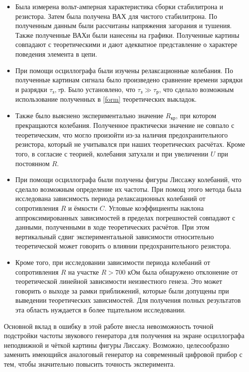\documentclass[a4paper,12pt]{article} %
\begin{document}
\begin{itemize}
	\item Была измерена вольт-амперная характеристика сборки стабилитрона и резистора. Затем была получена ВАХ для чистого стабилитрона. По полученным данным были рассчитаны напряжения загорания и тушения. Также полученные ВАХи были нанесены на графики. Полученные картины совпадают с теоретическими и дают адекватное представление о характере поведения элемента в цепи.
	\item При помощи осциллографа были изучены релаксационные колебания. По полученные картинам сигнала было произведено сравнение времени зарядки и разрядки $ \tau_\text{з}, \tau\text{р} $. Было установлено, что $ \tau_\text{з} \gg \tau_\text{р} $, что сделало возможным использование полученных в \ref{form} теоретических выкладок.
	\item Также было выяснено экспериментально значение $ R_\text{кр} $, при котором прекращаются колебания. Полученное практически значение не совпало с теоретическим, что могло произойти из-за наличия предохранительного резистора, который не учитывался при наших теоретических расчётах. Кроме того, в согласие с теорией, колебания затухали и при увеличении $ U $ при постоянном $ R $.
	\item При помощи осциллографа были получены фигуры Лиссажу колебаний, что сделало возможным определение их частоты. При помощ этого метода была исследована зависимость периода релаксационных колебаний от сопротивления $ R $ и ёмкости $ C $. Угловые коэффициенты наклона аппроксимированных зависимостей в пределах погрешностей совпадают с данными, полученными в ходе теоретических расчётов. При этом вертикальный сдвиг экспериментальной зависимости относительно теоретической может говорить о влиянии предохранительного резистора.
	\item Кроме того, при исследовании зависимости периода колебаний от сопротивления $ R $ на участке $ R > 700 $ кОм была обнаружено отклонение от теоретической линейной зависимости неизвестного генеза. Это может говорить о выходе за рамки приближений, которые были допущены при выведении теоретических зависимостей. Для получения полных результатов эта область нуждается в более тщательном исследовании.
\end{itemize}

Основной вклад в ошибку в этой работе внесла невозможность точной подстройки частоты звукового генератора для получения на экране осциллографа неподвижной и чёткой картины фигуры Лиссажу. Возможно, целесообразно заменить имеющийся аналоговый генератор на современный цифровой прибор с тем, чтобы значительно повысить точность эксперимента.
\end{document}
